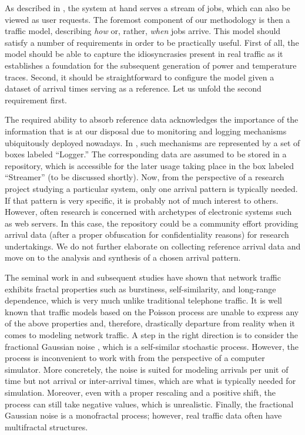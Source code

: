 As described in , the system at hand serves a stream
of jobs, which can also be viewed as user requests. The foremost component of
our methodology is then a traffic model, describing \emph{how} or, rather,
\emph{when} jobs arrive. This model should satisfy a number of requirements in
order to be practically useful. First of all, the model should be able to
capture the idiosyncrasies present in real traffic as it establishes a
foundation for the subsequent generation of power and temperature traces.
Second, it should be straightforward to configure the model given a dataset of
arrival times serving as a reference. Let us unfold the second requirement
first.

The required ability to absorb reference data acknowledges the importance of the
information that is at our disposal due to monitoring and logging mechanisms
ubiquitously deployed nowadays. In , such mechanisms are
represented by a set of boxes labeled ``Logger.'' The corresponding data are
assumed to be stored in a repository, which is accessible for the later usage
taking place in the box labeled ``Streamer'' (to be discussed shortly). Now,
from the perspective of a research project studying a particular system, only
one arrival pattern is typically needed. If that pattern is very specific, it is
probably not of much interest to others. However, often research is concerned
with archetypes of electronic systems such as web servers. In this case, the
repository could be a community effort providing arrival data (after a proper
obfuscation for confidentiality reasons) for research undertakings. We do not
further elaborate on collecting reference arrival data and move on to the
analysis and synthesis of a chosen arrival pattern.

The seminal work in \cite{leland1994} and subsequent studies have shown that
network traffic exhibits fractal properties such as burstiness, self-similarity,
and long-range dependence, which is very much unlike traditional telephone
traffic. It is well known that traffic models based on the Poisson process
\cite{lifshits2014} are unable to express any of the above properties and,
therefore, drastically departure from reality when it comes to modeling network
traffic. A step in the right direction is to consider the fractional Gaussian
noise \cite{lifshits2014}, which is a self-similar stochastic process. However,
the process is inconvenient to work with from the perspective of a computer
simulator. More concretely, the noise is suited for modeling arrivals per unit
of time but not arrival or inter-arrival times, which are what is typically
needed for simulation. Moreover, even with a proper rescaling and a positive
shift, the process can still take negative values, which is unrealistic.
Finally, the fractional Gaussian noise is a monofractal process; however, real
traffic data often have multifractal structures.

